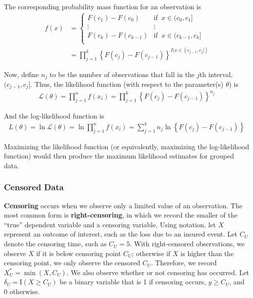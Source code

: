 \documentclass[]{book}
\theoremstyle{definition}
\theoremstyle{definition}
\theoremstyle{definition}
\theoremstyle{remark}
\begin{document}
The corresponding probability mass function for an observation is
\[\begin{aligned}
f(x) &=
\begin{cases}
F(c_1) - F(c_{0}) &   \text{if }\ x \in (c_{0}, c_1]\\
\vdots & \vdots \\
F(c_k) - F(c_{k-1}) &   \text{if }\ x \in (c_{k-1}, c_k]\\
\end{cases} \\
&= \prod_{j=1}^k \left\{F(c_j) - F(c_{j-1})\right\}^{I(x \in (c_{j-1}, c_j])}
\end{aligned}\]

Now, define \(n_j\) to be the number of observations that fall in the
\(j\)th interval, \((c_{j-1}, c_j]\). Thus, the likelihood function
(with respect to the parameter(s) \(\theta\)) is \[\begin{aligned}
\mathcal{L}(\theta) = \prod_{j=1}^n f(x_i) = \prod_{j=1}^k \left\{F(c_j) - F(c_{j-1})\right\}^{n_j}
\end{aligned}\]

And the log-likelihood function is \[\begin{aligned}
L(\theta) = \ln \mathcal{L}(\theta) = \ln \prod_{j=1}^n f(x_i) = \sum_{j=1}^k n_j \ln \left\{F(c_j) - F(c_{j-1})\right\}
\end{aligned}\]

Maximizing the likelihood function (or equivalently, maximizing the
log-likelihood function) would then produce the maximum likelihood
estimates for grouped data.

\subsubsection{Censored Data}\label{censored-data}

\textbf{Censoring} occurs when we observe only a limited value of an
observation. The most common form is \textbf{right-censoring}, in which
we record the smaller of the ``true'' dependent variable and a censoring
variable. Using notation, let \(X\) represent an outcome of interest,
such as the loss due to an insured event. Let \(C_U\) denote the
censoring time, such as \(C_U=5\). With right-censored observations, we
observe \(X\) if it is below censoring point \(C_U\); otherwise if \(X\)
is higher than the censoring point, we only observe the censored
\(C_U\). Therefore, we record \(X_U^{\ast}= \min(X, C_U)\). We also
observe whether or not censoring has occurred. Let
\(\delta_U= \mathrm{I}(X \geq C_U)\) be a binary variable that is 1 if
censoring occurs, \(y \geq C_U\), and 0 otherwise.
\end{document}
